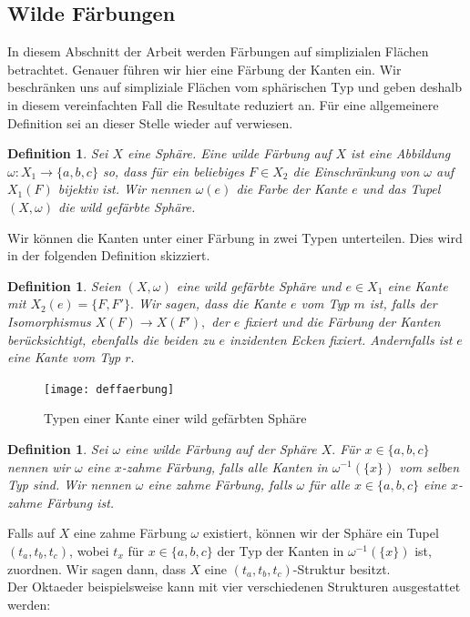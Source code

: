 \documentclass[12pt,titlepage,twoside,cleardoublepage]{article}
\theoremstyle{nummermitklammern}
\newtheorem{definition}[temp]{Definition}
\newtheorem{definition}[zahl]{Definition}
\numberwithin{equation}{section}
\begin{document}
\subsection{Wilde Färbungen}
In diesem Abschnitt der Arbeit werden Färbungen auf simplizialen Flächen betrachtet. Genauer führen wir hier eine Färbung der Kanten ein. Wir beschränken uns auf simpliziale Flächen vom sphärischen Typ und geben deshalb in diesem vereinfachten Fall die Resultate reduziert an. Für eine allgemeinere Definition sei an dieser Stelle wieder auf \cite{simp} verwiesen.
\begin{definition}
Sei $X$ eine Sphäre. Eine \emph{wilde Färbung} auf $X$ ist eine Abbildung $\omega:X_1\to \{a,b,c\}$ so, dass für ein beliebiges $F\in X_2$ die Einschränkung von $\omega$ auf $X_1(F)$ bijektiv ist. Wir nennen $\omega(e)$ die \emph{Farbe} der Kante $e$ und das Tupel $(X,\omega)$ die \emph{wild gefärbte Sphäre}. 
\end{definition}
Wir können die Kanten unter einer Färbung in zwei Typen unterteilen. Dies wird in der folgenden Definition skizziert.
\begin{definition}
Seien $(X,\omega)$ eine wild gefärbte Sphäre und $e\in X_1$ eine Kante mit $X_2(e)=\{F,F'\}.$ Wir sagen, dass die Kante $e$ vom \emph{Typ $m$} ist, falls der Isomorphismus $X(F)\to X(F'),$ der $e$ fixiert und die Färbung der Kanten berücksichtigt, ebenfalls die beiden zu $e$ inzidenten Ecken fixiert. Andernfalls ist $e$ eine Kante vom \emph{Typ $r.$}
\end{definition}
\begin{figure}[H]
\begin{center}
\texttt{[image: deffaerbung]}
\end{center}
\caption{Typen einer Kante einer wild gefärbten Sphäre}
\end{figure}
\begin{definition}
Sei $\omega$ eine wilde Färbung auf der Sphäre $X.$ Für $x\in \{a,b,c\}$ nennen wir $\omega$ eine \emph{$x$-zahme} Färbung, falls  alle Kanten in $\omega^{-1}(\{x\})$ vom selben Typ sind. Wir nennen $\omega$ eine \emph{zahme Färbung}, falls $\omega$ für alle $x\in \{a,b,c\}$ eine $x$-zahme Färbung ist. 
\end{definition}
Falls auf $X$ eine zahme Färbung $\omega$ existiert, können wir der Sphäre ein Tupel $(t_a,t_b,t_c)$, wobei $t_x$ für $x\in \{a,b,c\}$ der Typ der Kanten in $\omega^{-1}(\{x\})$ ist, zuordnen. Wir sagen dann, dass $X$ eine $(t_a,t_b,t_c)$-Struktur besitzt.\\
Der Oktaeder beispielsweise kann mit vier verschiedenen Strukturen ausgestattet werden:
\end{document}
